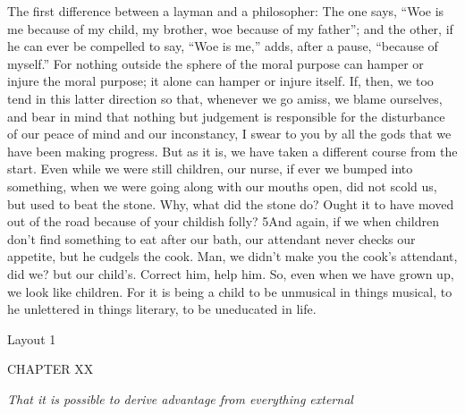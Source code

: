 The first difference between a layman and a philosopher: The one says, ``Woe is me because of my child, my brother, woe because of my father''; and the other, if he can ever be compelled to say, ``Woe is me,'' adds, after a pause, ``because of myself.'' For nothing outside the sphere of the moral purpose can hamper or injure the moral purpose; it alone can hamper or injure itself. If, then, we too tend in this latter direction so that, whenever we go amiss, we blame ourselves, and bear in mind that nothing but judgement is responsible for the disturbance of our peace of mind and our inconstancy, I swear to you by all the gods that we have been making progress. But as it is, we have taken a different course from the start. Even while we were still children, our nurse, if ever we bumped into something, when we were going along with our mouths open, did not scold us, but used to beat the stone. Why, what did the stone do? Ought it to have moved out of the road because of your childish folly? 5And again, if we when children don't find something to eat after our bath, our attendant never checks our appetite, but he cudgels the cook. Man, we didn't make you the cook's attendant, did we? but our child's. Correct him, help him. So, even when we have grown up, we look like children. For it is being a child to be unmusical in things musical, to he unlettered in things literary, to be uneducated in life.


Layout 1

CHAPTER XX

\emph{That it is possible to derive advantage from everything external}

